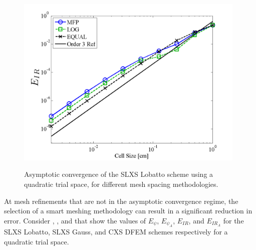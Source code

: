 \begin{figure}[!htp]
\begin{center}
{\includegraphics[width=11cm]{chapter3_variable_xs/P2_LOBATTO_E_IR.png}
}
\end{center}
\caption{Asymptotic convergence of the SLXS Lobatto scheme using a quadratic trial space, for different mesh spacing methodologies.}
\label{fig:lobatto_spacing}
\end{figure}
At mesh refinements that are not in the asymptotic convergence regime, the selection of a smart meshing methodology can result in a significant reduction in error.  
Consider , , and  that show the values of $E_{\psi}$, $E_{\psi_A}$, $E_{IR}$, and $E_{IR_A}$ for the SLXS Lobatto, SLXS Gauss, and CXS DFEM schemes respectively for a quadratic trial space.
